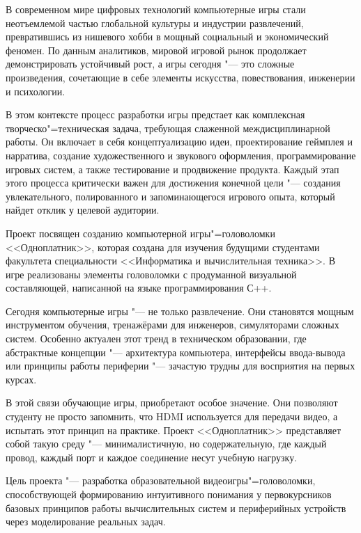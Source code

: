 В современном мире цифровых технологий компьютерные игры стали неотъемлемой частью глобальной культуры и индустрии развлечений, превратившись из нишевого хобби в мощный социальный и экономический феномен. По данным аналитиков, мировой игровой рынок продолжает демонстрировать устойчивый рост, а игры сегодня "--- это сложные произведения, сочетающие в себе элементы искусства, повествования, инженерии и психологии.

В этом контексте процесс разработки игры предстает как комплексная творческо"=техническая задача, требующая слаженной междисциплинарной работы. Он включает в себя концептуализацию идеи, проектирование геймплея и нарратива, создание художественного и звукового оформления, программирование игровых систем, а также тестирование и продвижение продукта. Каждый этап этого процесса критически важен для достижения конечной цели "--- создания увлекательного, полированного и запоминающегося игрового опыта, который найдет отклик у целевой аудитории.

Проект посвящен созданию компьютерной игры"=головоломки <<Одноплатник>>, которая создана для изучения будущими студентами факультета специальности <<Информатика и вычислительная техника>>. В игре реализованы элементы  головоломки с продуманной визуальной составляющей, написанной на языке программирования С++.

Сегодня компьютерные игры "--- не только развлечение. Они становятся мощным инструментом обучения, тренажёрами для инженеров, симуляторами сложных систем. Особенно актуален этот тренд в техническом образовании, где абстрактные концепции "--- архитектура компьютера, интерфейсы ввода-вывода или принципы работы периферии "--- зачастую трудны для восприятия на первых курсах.

В этой связи обучающие игры, приобретают особое значение. Они позволяют студенту не просто запомнить, что HDMI используется для передачи видео, а испытать этот принцип на практике. Проект <<Одноплатник>> представляет собой такую среду "--- минималистичную, но содержательную, где каждый провод, каждый порт и каждое соединение несут учебную нагрузку.

Цель проекта "--- разработка образовательной видеоигры"=головоломки, способствующей формированию интуитивного понимания у первокурсников базовых принципов работы вычислительных систем и периферийных устройств через моделирование реальных задач.